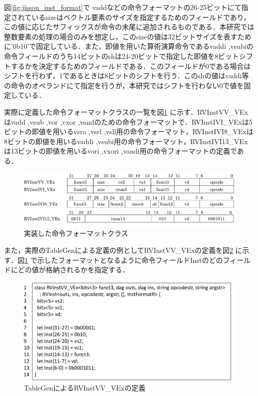 図\ref{fig:jissou_inst_format}で
vaddなどの命令フォーマットの26-25ビットにて指定されているsizeはベクトル要素のサイズを指定するためのフィールドであり，この値に応じたサフィックスが命令の末尾に追加されるものである．本研究では整数要素の処理の場合のみを想定し，このsizeの値は32ビットサイズを表すために'0b10'で固定している．また，即値を用いた算術演算命令であるvaddi ,vsubiの命令フィールドのうち14ビットのshは24-20ビットで指定した即値を8ビットシフトするかを決定するためのフィールドである．このフィールドが0である場合はシフトを行わず，1であるときは8ビットのシフトを行う．このshの値はvaddi等の命令のオペランドにて指定を行うが，本研究ではシフトを行わない0で値を固定している．

実際に定義した命令フォーマットクラスの一覧を図\ref{fig:jissou_inst_format_class}
に示す．RVInstVV\_VExはvadd ,vsub ,vor ,vxor ,vandのための命令フォーマットで．RVInstIVI\_VExは5ビットの即値を用いるvsra ,vsrl ,vsll用の命令フォーマット，RVInstIVI8\_VExは8ビットの即値を用いるvaddi ,vsubi用の命令フォーマット，RVInstIVI13\_VExは13ビットの即値を用いるvori ,vxori ,vandi用の命令フォーマットの定義である．

\begin{figure}[tb]
    \centering
    \includegraphics[scale=0.8]{image/jissou_inst_format_class.pdf}
    \caption{実装した命令フォーマットクラス}
    \label{fig:jissou_inst_format_class}
\end{figure}

また，実際のTableGenによる定義の例としてRVInstVV\_VExの定義を図\ref{fig:RVInstVVMIQS}
に示す．図\ref{fig:jissou_inst_format_class}
で示したフォーマットとなるように命令フィールドInstのどのフィールドにどの値が格納されるかを指定する．

\begin{figure}[tb]
    \centering
    \includegraphics[scale=0.6]{image/RVInstVVMIQS_v2.pdf}
    \caption{TableGenによるRVInstVV\_VExの定義}
    \label{fig:RVInstVVMIQS}
\end{figure}


